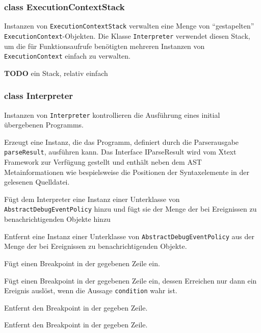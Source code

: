 \subsubsection{class ExecutionContextStack}

Instanzen von \texttt{ExecutionContextStack} verwalten eine Menge von "`gestapelten"' \texttt{ExecutionContext}-Objekten. Die Klasse \texttt{Interpreter} verwendet diesen Stack, um die für Funktionsaufrufe benötigten mehreren Instanzen von \texttt{ExecutionContext} einfach zu verwalten.

\textbf{TODO} ein Stack, relativ einfach

\subsubsection{class Interpreter}

Instanzen von \texttt{Interpreter} kontrollieren die Ausführung eines initial übergebenen Programms.

\begin{description}
    Erzeugt eine Instanz, die das Programm, definiert durch die Parserausgabe \texttt{parseResult}, ausführen kann. Das Interface IParseResult wird vom Xtext Framework zur Verfügung gestellt und enthält neben dem AST Metainformationen wie bespielsweise die Positionen der Syntaxelemente in der gelesenen Quelldatei.

    Fügt dem Interpreter eine Instanz einer Unterklasse von \texttt{AbstractDebugEventPolicy} hinzu und fügt sie der Menge der bei Ereignissen zu benachrichtigenden Objekte hinzu

    Entfernt eine Instanz einer Unterklasse von \texttt{AbstractDebugEventPolicy} aus der Menge der bei Ereignissen zu benachrichtigenden Objekte.

    Fügt einen Breakpoint in der gegebenen Zeile ein.

    Fügt einen Breakpoint in der gegebenen Zeile ein, dessen Erreichen nur dann ein Ereignis auslöst, wenn die Aussage \texttt{condition} wahr ist.

    Entfernt den Breakpoint in der gegeben Zeile.

    Entfernt den Breakpoint in der gegeben Zeile.

\end{description}


